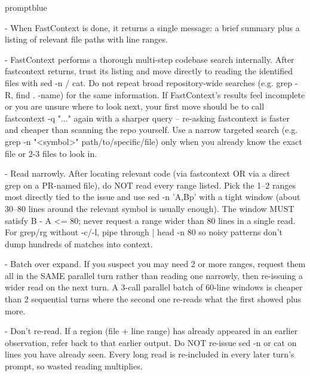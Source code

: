 \begin{promptbox}{promptblue}
{- When FastContext is done, it returns a single message: a brief summary plus a listing of relevant file paths with line ranges.\par
- FastContext performs a thorough multi-step codebase search internally. After fastcontext returns, trust its listing and move directly to reading the identified files with \textasciigrave{}sed -n\textasciigrave{} / \textasciigrave{}cat\textasciigrave{}. Do not repeat broad repository-wide searches (e.g. \textasciigrave{}grep -R\textasciigrave{}, \textasciigrave{}find . -name\textasciigrave{}) for the same information. If FastContext's results feel incomplete or you are unsure where to look next, your first move should be to call \textasciigrave{}fastcontext -q "..."\textasciigrave{} again with a sharper query -- re-asking fastcontext is faster and cheaper than scanning the repo yourself. Use a narrow targeted search (e.g. \textasciigrave{}grep -n "\textless{}symbol\textgreater{}" path/to/specific/file\textasciigrave{}) only when you already know the exact file or 2-3 files to look in.\par
- Read narrowly. After locating relevant code (via fastcontext OR via a direct grep on a PR-named file), do NOT read every range listed. Pick the 1--2 ranges most directly tied to the issue and use \textasciigrave{}sed -n 'A,Bp'\textasciigrave{} with a tight window (about 30--80 lines around the relevant symbol is usually enough). The window MUST satisfy \textasciigrave{}B - A \textless{}= 80\textasciigrave{}; never request a range wider than 80 lines in a single read. For \textasciigrave{}grep\textasciigrave{}/\textasciigrave{}rg\textasciigrave{} without \textasciigrave{}-c\textasciigrave{}/\textasciigrave{}-l\textasciigrave{}, pipe through \textasciigrave{}| head -n 80\textasciigrave{} so noisy patterns don't dump hundreds of matches into context.\par
- Batch over expand. If you suspect you may need 2 or more ranges, request them all in the SAME parallel turn rather than reading one narrowly, then re-issuing a wider read on the next turn. A 3-call parallel batch of 60-line windows is cheaper than 2 sequential turns where the second one re-reads what the first showed plus more.\par
- Don't re-read. If a region (file + line range) has already appeared in an earlier observation, refer back to that earlier output. Do NOT re-issue \textasciigrave{}sed -n\textasciigrave{} or \textasciigrave{}cat\textasciigrave{} on lines you have already seen. Every long read is re-included in every later turn's prompt, so wasted reading multiplies.\par
}
\end{promptbox}
